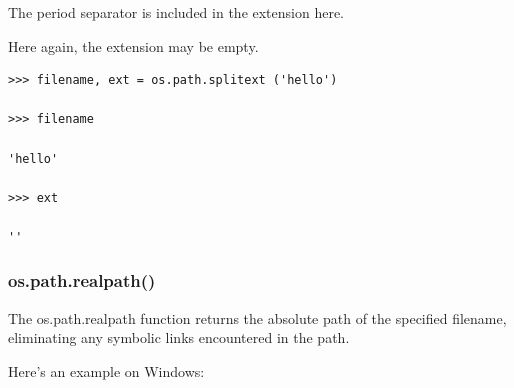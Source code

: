 \documentclass{article}
\begin{document}
The period separator is included in the extension here.

Here again, the extension may be empty.  

\begin{lstlisting}
>>> filename, ext = os.path.splitext ('hello')

>>> filename

'hello'

>>> ext

''
\end{lstlisting}

\subsubsection{os.path.realpath()}

The os.path.realpath function returns the absolute path of the specified filename, eliminating any symbolic links encountered in the path. 

Here's an example on Windows:
\end{document}
